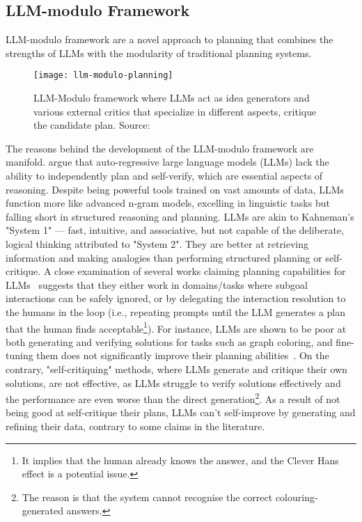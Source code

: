 \subsection{LLM-modulo Framework}
\label{subsec:llm-modulo}

LLM-modulo framework are a novel approach to planning that combines the strengths of LLMs with the modularity of traditional planning systems.

\begin{figure}
	\centering
	\texttt{[image: llm-modulo-planning]}
	\caption{LLM-Modulo framework where LLMs act as idea generators and various external critics that specialize in different aspects, critique the candidate plan. Source: \textcite{kambhampati2024llmscantplanhelp}}
	\label{fig:llm-modulo-framework}
\end{figure}

The reasons behind the development of the LLM-modulo framework are manifold.
\textcite{kambhampati2024llmscantplanhelp} argue that auto-regressive large language models (LLMs) lack the ability to independently plan and self-verify, which are essential aspects of reasoning.
Despite being powerful tools trained on vast amounts of data, LLMs function more like advanced n-gram models, excelling in linguistic tasks but falling short in structured reasoning and planning.
LLMs are akin to Kahneman's "System 1" — fast, intuitive, and associative, but not capable of the deliberate, logical thinking attributed to "System 2".
They are better at retrieving information and making analogies than performing structured planning or self-critique.
A close examination of several works claiming planning capabilities for LLMs~\cite{kambhampati2023role} suggests that they either work in domains/tasks where subgoal interactions can be safely ignored, or by delegating the interaction resolution to the humans in the loop (i.e., repeating prompts until the LLM generates a plan that the human finds acceptable\footnote{It implies that the human already knows the answer, and the Clever Hans effect is a potential issue.}).
For instance, LLMs are shown to be poor at both generating and verifying solutions for tasks such as graph coloring, and fine-tuning them does not significantly improve their planning abilities~\cite{kahneman2011thinking}.
On the contrary, "self-critiquing" methods, where LLMs generate and critique their own solutions, are not effective, as LLMs struggle to verify solutions effectively and the performance are even worse than the direct generation\footnote{The reason is that the system cannot recognise the correct colouring-generated answers.}.
As a result of not being good at self-critique their plans, LLMs can't self-improve by generating and refining their data, contrary to some claims in the literature\cite{kambhampati2024llmscantplanhelp}.

